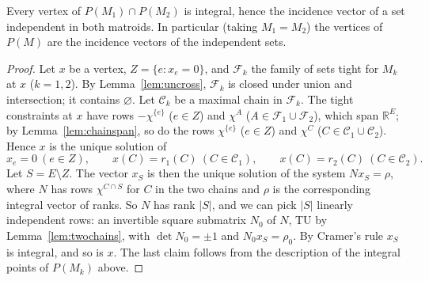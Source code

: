 \begin{theorem}[Edmonds, 1970]\label{thm:matroidpolytope}
Every vertex of $P(M_1)\cap P(M_2)$ is integral, hence the incidence vector of a set independent in both matroids. In particular (taking $M_1=M_2$) the vertices of $P(M)$ are the incidence vectors of the independent sets.
\end{theorem}
\begin{proof}
Let $x$ be a vertex, $Z=\{e:x_e=0\}$, and $\mathcal F_k$ the family of sets tight for $M_k$ at $x$ ($k=1,2$). By Lemma~\ref{lem:uncross}, $\mathcal F_k$ is closed under union and intersection; it contains $\varnothing$. Let $\mathcal C_k$ be a maximal chain in
$\mathcal F_k$. The tight constraints at $x$ have rows $-\chi^{\{e\}}$ ($e\in Z$) and $\chi^A$ ($A\in\mathcal F_1\cup\mathcal F_2$), which span $\mathbb R^E$; by Lemma~\ref{lem:chainspan}, so do the rows $\chi^{\{e\}}$ ($e\in Z$) and $\chi^C$
($C\in\mathcal C_1\cup\mathcal C_2$). Hence $x$ is the unique solution of
\[
x_e=0\ (e\in Z),\qquad x(C)=r_1(C)\ (C\in\mathcal C_1),\qquad x(C)=r_2(C)\ (C\in\mathcal C_2).
\]
Let $S=E\setminus Z$. The vector $x_S$ is then the unique solution of the system $Nx_S=\rho$, where $N$ has rows $\chi^{C\cap S}$ for $C$ in the two chains and $\rho$ is the corresponding integral vector of ranks. So $N$ has rank $|S|$, and we can pick
$|S|$ linearly independent rows: an invertible square submatrix $N_0$ of $N$, TU by Lemma~\ref{lem:twochains}, with $\det N_0=\pm1$ and $N_0x_S=\rho_0$. By Cramer's rule $x_S$ is integral, and so is $x$. The last claim follows from the description of the
integral points of $P(M_k)$ above.
\end{proof}

